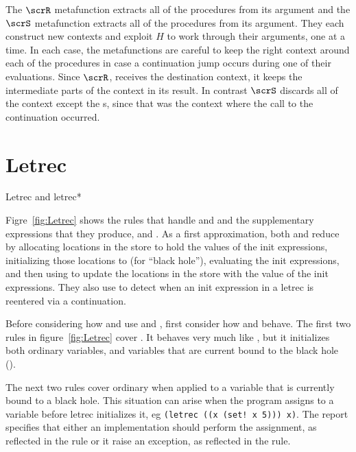 The $\scrR$ metafunction extracts all of the 
procedures from its argument and the $\scrS$ metafunction extracts all of the  procedures from its argument. They each construct new contexts and exploit
$H$ to work through their arguments, one  at a time.
In each case, the metafunctions are careful to keep the right
 context around each of the procedures in case a continuation
jump occurs during one of their evaluations. 
Since $\scrR$,
receives the destination context, it keeps the intermediate
parts of the context in its result.
In contrast
$\scrS$ discards all of the context except the s,
since that was the context where the call to the
continuation occurred.

\section{Letrec}

\beginfig
\begin{center}

\end{center}
\caption{Letrec and letrec*}
\label{fig:Letrec}
\endfig

Figre~\ref{fig:Letrec} shows the rules that handle  and  and the supplementary expressions that they produce,  and . As a first approximation, both  and  reduce by allocating locations in the store to hold the values of the init expressions, initializing those locations to  (for ``black hole''), evaluating the init expressions, and then using  to update the locations in the store with the value of the init expressions. They also use  to detect when an init expression in a letrec is reentered via a continuation.

Before considering how  and  use  and , first consider how  and  behave. The first two rules in figure~\ref{fig:Letrec} cover . It behaves very much like , but it initializes both ordinary variables, and variables that are current bound to the black hole ().

The next two rules cover ordinary  when applied to a variable
that is currently bound to a black hole. This situation can arise when
the program assigns to a variable before letrec initializes it, eg
\verb|(letrec ((x (set! x 5))) x)|. The report specifies that either
an implementation should perform the assignment, as reflected in the
 rule or it raise an exception, as reflected in the  rule.

